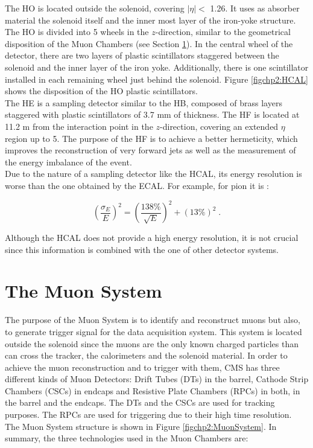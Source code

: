 \noindent The HO is located outside the solenoid, covering $|\eta| < $ 1.26. It uses as absorber 
material the solenoid itself and the inner most layer of the iron-yoke structure. The HO 
is divided into 5 wheels in the $z$-direction, similar to the geometrical disposition 
of the Muon Chambers (see Section \ref{sec:MuonSys}). In the central wheel of the detector, there 
are two layers of plastic scintillators staggered between the solenoid and the inner 
layer of the iron yoke. Additionally, there is one scintillator installed in 
each remaining wheel just behind the solenoid. Figure \ref{figchp2:HCAL} shows the disposition of 
the HO plastic scintillators. \\

\noindent The HE is a sampling detector similar to the HB, composed of brass layers 
staggered with plastic scintillators of 3.7 mm of thickness. The HF 
is located at 11.2 m from the interaction point in the $z$-direction,
covering an extended $\eta$ region up to 5. The purpose of the HF is 
to achieve a better hermeticity, which improves the reconstruction of very forward 
jets as well as the measurement of the energy imbalance of the event. \\

\noindent Due to the nature of a sampling detector like the HCAL, its energy resolution 
is worse than the one obtained by the ECAL. For example, for pion it is \cite{chp2:CMS}:

\begin{equation} \label{CALResolution}
 \left(\frac{\sigma_{E}}{E}\right)^{2} = \left(\frac{138\%}{\sqrt{E}}\right)^{2} + \left(13\% \right)^{2} \;.
\end{equation}

\noindent Although the HCAL does not provide a high energy resolution, it is not crucial
since this information is combined with the one of other detector systems.

\section{The Muon System}
\label{sec:MuonSys}

\noindent The purpose of the Muon System is to identify and reconstruct muons but also,
to generate trigger signal for the data acquisition system. This system
is located outside the solenoid since the muons are the only known charged particles 
than can cross the tracker, the calorimeters and the solenoid material. In order to achieve the
muon reconstruction and to trigger with them, CMS has three different kinds of 
Muon Detectors: Drift Tubes (DTs) in the barrel, Cathode Strip Chambers (CSCs) in endcaps and Resistive 
Plate Chambers (RPCs) in both, in the barrel and the endcaps. The DTs and the CSCs are used for tracking 
purposes. The RPCs are used for triggering due to their high time 
resolution. The Muon System structure is shown in Figure \ref{figchp2:MuonSystem}. In summary, 
the three technologies used in the Muon Chambers are:

